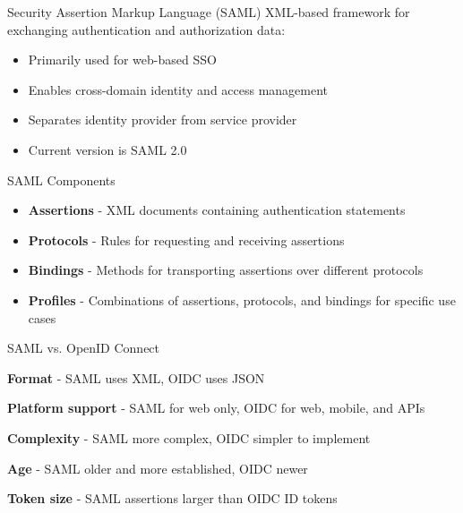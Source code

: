 \begin{definition}{Security Assertion Markup Language (SAML)}
 XML-based framework for exchanging authentication and authorization data:
\begin{itemize}
    \item Primarily used for web-based SSO
    \item Enables cross-domain identity and access management
    \item Separates identity provider from service provider
    \item Current version is SAML 2.0
\end{itemize}
\end{definition}

\begin{concept}{SAML Components}
\begin{itemize}
    \item \textbf{Assertions} - XML documents containing authentication statements
    \item \textbf{Protocols} - Rules for requesting and receiving assertions
    \item \textbf{Bindings} - Methods for transporting assertions over different protocols
    \item \textbf{Profiles} - Combinations of assertions, protocols, and bindings for specific use cases
\end{itemize}
\end{concept}

\begin{concept}{SAML vs. OpenID Connect}

    \textbf{Format} - SAML uses XML, OIDC uses JSON

    \textbf{Platform support} - SAML for web only, OIDC for web, mobile, and APIs

    \textbf{Complexity} - SAML more complex, OIDC simpler to implement

    \textbf{Age} - SAML older and more established, OIDC newer

    \textbf{Token size} - SAML assertions larger than OIDC ID tokens

\end{concept}
\multend

